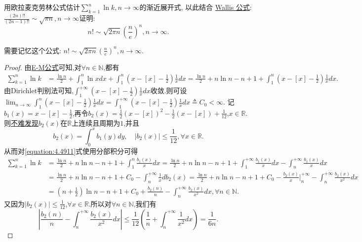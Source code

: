 \documentclass[lang=cn,newtx,10pt,scheme=chinese]{elegantbook}
\begin{document}
\begin{proposition}\label{example:E-M4.49}
   用欧拉麦克劳林公式估计\(\sum_{k = 1}^{n}\ln k,n\to\infty\)的渐近展开式, 以此结合 \hyperref[theorem:Wallis公式]{Wallis 公式}:\(\frac{(2n)!!}{(2n - 1)!!}\sim\sqrt{\pi n},n\to\infty\)证明:
\[
n!\sim\sqrt{2\pi n}\left(\frac{n}{e}\right)^{n},n\to\infty.
\]
\end{proposition}
\begin{note}
   需要记忆这个公式:
   $n!\sim\sqrt{2\pi n}\left(\frac{n}{e}\right)^{n},n\to\infty.$
\end{note}
\begin{proof}
由\hyperref[proposition:0阶欧拉麦克劳林公式(0阶E-M公式)]{E-M公式}可知,对\(\forall n\in\mathbb{N}\),都有
\begin{align}\label{equation:4.4911}
\sum_{k = 1}^n\ln k&=\frac{\ln n}{2}+\int_1^n\ln xdx+\int_1^n\left(x - [x] - \frac{1}{2}\right)\frac{1}{x}dx
=\frac{\ln n}{2}+n\ln n - n + 1+\int_1^n\left(x - [x] - \frac{1}{2}\right)\frac{1}{x}dx.
\end{align}
由Dirichlet判别法可知,\(\int_1^{+\infty}\left(x - [x] - \frac{1}{2}\right)\frac{1}{x}dx\)收敛.则可设\(\lim_{n\rightarrow\infty}\int_1^n\left(x - [x] - \frac{1}{2}\right)\frac{1}{x}dx=\int_1^{+\infty}\left(x - [x] - \frac{1}{2}\right)\frac{1}{x}dx\triangleq C_0<\infty\).
记\(b_1(x)=x - [x] - \frac{1}{2}\),再令\(b_2(x)=\frac{1}{2}(x - [x])^2 - \frac{1}{2}(x - [x]) + \frac{1}{12}\),\(x\in\mathbb{R}\).则\hyperlink{b2性质}{不难发现}\(b_2(x)\)在\(\mathbb{R}\)上连续且周期为\(1\),并且
\[
b_2(x)=\int_0^x{b_1(y)dy}, \quad |b_2(x)|\leqslant\frac{1}{12}, \forall x\in\mathbb{R}.
\]
从而对\eqref{equation:4.4911}式使用分部积分可得
\begin{align*}
   \sum_{k=1}^n{\ln k}&=\frac{\ln n}{2}+n\ln n-n+1+\int_1^n{\frac{b_1\left( x \right)}{x}dx}=\frac{\ln n}{2}+n\ln n-n+1+\int_1^{+\infty}{\frac{b_1\left( x \right)}{x}dx}-\int_n^{+\infty}{\frac{b_1\left( x \right)}{x}dx}
   \\
   &=\frac{\ln n}{2}+n\ln n-n+1+C_0-\int_n^{+\infty}{\frac{1}{x}db_2\left( x \right)}=\frac{\ln n}{2}+n\ln n-n+1+C_0-\frac{b_2\left( x \right)}{x}\Big|_{n}^{+\infty}-\int_n^{+\infty}{\frac{b_2\left( x \right)}{x^2}dx}
   \\
   &=\left( n+\frac{1}{2} \right) \ln n-n+1+C_0+\frac{b_2\left( n \right)}{n}-\int_n^{+\infty}{\frac{b_2\left( x \right)}{x^2}dx},\forall n\in\mathbb{N}.
\end{align*}
又因为\(|b_2(x)|\leqslant\frac{1}{12}\),\(\forall x\in\mathbb{R}\).所以对\(\forall n\in\mathbb{N}\),我们有
\[
\left|\frac{b_2(n)}{n} - \int_n^{+\infty}\frac{b_2(x)}{x^2}dx\right|\leqslant\frac{1}{12}\left(\frac{1}{n}+\int_n^{+\infty}\frac{1}{x^2}dx\right)=\frac{1}{6n}.
\]
\end{proof}
\end{document}
